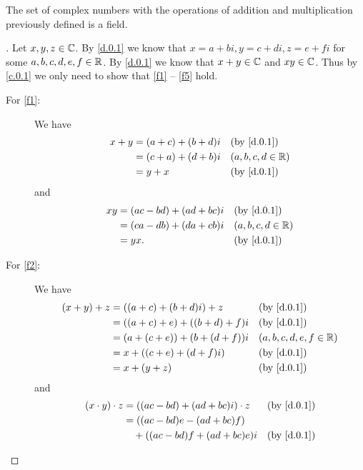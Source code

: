 \begin{thm}\label{d.1}
	The set of complex numbers with the operations of addition and multiplication previously defined is a field.
\end{thm}

\begin{proof}[]
	Let \(x, y, z \in \mathbb{C}\).
	By \cref{d.0.1} we know that \(x = a + bi, y = c + di, z = e + fi\) for some \(a, b, c, d, e, f \in \mathbb{R}\).
	By \cref{d.0.1} we know that \(x + y \in \mathbb{C}\) and \(xy \in \mathbb{C}\).
	Thus by \cref{c.0.1} we only need to show that \ref{f1} -- \ref{f5} hold.
	\begin{description}
		\item[For \ref{f1}:]
			We have
			\begin{align*}
				x + y & = (a + c) + (b + d) i &  & \by{d.0.1}          \\
				      & = (c + a) + (d + b) i &  & (a, b, c, d \in \R) \\
				      & = y + x               &  & \by{d.0.1}
			\end{align*}
			and
			\begin{align*}
				xy & = (ac - bd) + (ad + bc) i &  & \by{d.0.1}          \\
				   & = (ca - db) + (da + cb) i &  & (a, b, c, d \in \R) \\
				   & = yx.                     &  & \by{d.0.1}
			\end{align*}
		\item[For \ref{f2}:]
			We have
			\begin{align*}
				(x + y) + z & = ((a + c) + (b + d)i) + z        &  & \by{d.0.1}                \\
				            & = ((a + c) + e) + ((b + d) + f) i &  & \by{d.0.1}                \\
				            & = (a + (c + e)) + (b + (d + f)) i &  & (a, b, c, d, e, f \in \R) \\
				            & = x + ((c + e) + (d + f)i)        &  & \by{d.0.1}                \\
				            & = x + (y + z)                     &  & \by{d.0.1}
			\end{align*}
			and
			\begin{align*}
				(x \cdot y) \cdot z & = ((ac - bd) + (ad + bc) i) \cdot z   &  & \by{d.0.1}                \\
				                    & = ((ac - bd) e - (ad + bc) f)                                        \\
				                    & \quad + ((ac - bd) f + (ad + bc) e) i &  & \by{d.0.1}                \\

\end{align*}
\end{description}
\end{proof}
